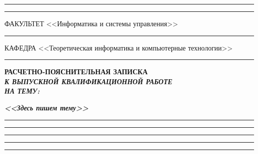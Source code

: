 \documentclass[14pt, russian]{scrartcl}
\begin{document}
\begin{titlepage}
\vspace{-2pt}
\hspace{-34.5pt}\rule{\textwidth}{0.5pt}

\vspace*{-18.3pt}
\hspace{-34.5pt}\rule{\textwidth}{2.5pt}
 
\vspace{0.5ex}
\noindent \small ФАКУЛЬТЕТ\hspace{80pt} <<Информатика и системы управления>>

\vspace*{-16pt}
\hspace{35pt}\rule{0.855\textwidth}{0.4pt}

\vspace{0.5ex}
\noindent \small КАФЕДРА\hspace{50pt} <<Теоретическая информатика и компьютерные технологии>>

\vspace*{-16pt}
\hspace{25pt}\rule{0.875\textwidth}{0.4pt}
 
 
\vspace{3em}
 
\begin{center}
\Large \bf{РАСЧЕТНО-ПОЯСНИТЕЛЬНАЯ ЗАПИСКА\\\textbf{\textit{К ВЫПУСКНОЙ КВАЛИФИКАЦИОННОЙ РАБОТЕ\\НА ТЕМУ:}} \\}
\end{center}

\vspace*{-6ex} 
\begin{center}
\Large{\textit{\textbf{<<Здесь пишем тему>>}}}

\vspace*{-3ex}
\rule{1\textwidth}{1.2pt}

\vspace*{-0.2ex}
\rule{1\textwidth}{1.2pt}

\vspace*{-0.2ex}
\rule{1\textwidth}{1.2pt}

\vspace*{-0.2ex}
\rule{1\textwidth}{1.2pt}

\vspace*{-0.2ex}
\rule{1\textwidth}{1.2pt}
\end{center}
 
\vspace{\fill}
 


\end{titlepage}
\end{document}
